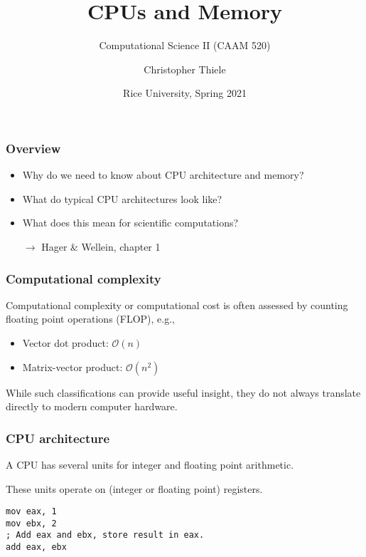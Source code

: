 \documentclass[12pt,t]{beamer}
\newcommand{\conclude}[1]{%
  \begin{itemize}
    \item[$\rightarrow$]#1
  \end{itemize}
}
\begin{document}
  \title{CPUs and Memory}
  \subtitle{Computational Science II (CAAM 520)}
  \author{Christopher Thiele}
  \date{Rice University, Spring 2021}

  \begin{frame}
    \titlepage
  \end{frame}


  \begin{frame}[fragile]
    \frametitle{Overview}

    \begin{itemize}
      \item Why do we need to know about CPU architecture and memory?
      \item What do typical CPU architectures look like?
      \item What does this mean for scientific computations?
    \end{itemize}

    \conclude{Hager \& Wellein, chapter 1}
  \end{frame}

  \begin{frame}[fragile]
    \frametitle{Computational complexity}

    Computational complexity or computational cost is often assessed by counting floating point operations (FLOP), e.g.,
    \begin{itemize}
      \item Vector dot product: $\mathcal O(n)$
      \item Matrix-vector product: $\mathcal O(n^2)$
    \end{itemize}

    While such classifications can provide useful insight, they do not always translate directly to modern computer hardware.
  \end{frame}

  \begin{frame}[fragile]
    \frametitle{CPU architecture}

    A CPU has several units for integer and floating point arithmetic.

    These units operate on (integer or floating point) registers.

    \begin{lstlisting}[frame=single]
mov eax, 1
mov ebx, 2
; Add eax and ebx, store result in eax.
add eax, ebx
    \end{lstlisting}
  \end{frame}
\end{document}
